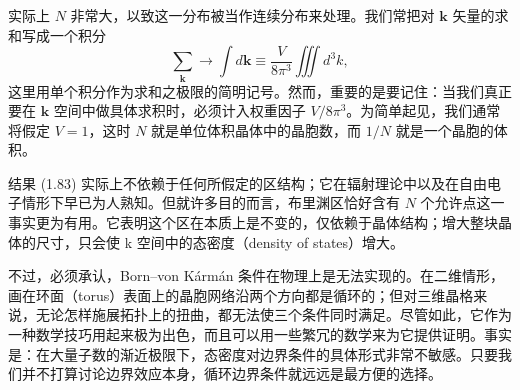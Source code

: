 实际上 $N$ 非常大，以致这一分布被当作连续分布来处理。我们常把对 $\mathbf{k}$ 矢量的求和写成一个积分
\begin{equation*}
\sum_{\mathbf{k}}\rightarrow\int d\mathbf{k}\equiv\frac{V}{8\pi^3}\iiint d^3k,
\tag{1.84}
\end{equation*}
这里用单个积分作为求和之极限的简明记号。然而，重要的是要记住：当我们真正要在 $\mathbf{k}$ 空间中做具体求积时，必须计入权重因子 $V/8\pi^3$。为简单起见，我们通常将假定 $V=1$，这时 $N$ 就是单位体积晶体中的晶胞数，而 $1/N$ 就是一个晶胞的体积。

结果 (1.83) 实际上不依赖于任何所假定的区结构；它在辐射理论中以及在自由电子情形下早已为人熟知。但就许多目的而言，布里渊区恰好含有 $N$ 个允许点这一事实更为有用。它表明这个区在本质上是不变的，仅依赖于晶体结构；增大整块晶体的尺寸，只会使 k 空间中的态密度（density of states）增大。

不过，必须承认，Born–von Kármán 条件在物理上是无法实现的。在二维情形，画在环面（torus）表面上的晶胞网络沿两个方向都是循环的；但对三维晶格来说，无论怎样施展拓扑上的扭曲，都无法使三个条件同时满足。尽管如此，它作为一种数学技巧用起来极为出色，而且可以用一些繁冗的数学来为它提供证明。事实是：在大量子数的渐近极限下，态密度对边界条件的具体形式非常不敏感。只要我们并不打算讨论边界效应本身，循环边界条件就远远是最方便的选择。
